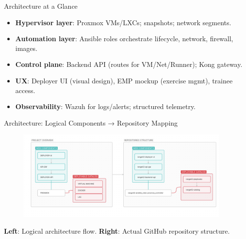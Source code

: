 \documentclass[aspectratio=169]{beamer}
\begin{document}
\begin{frame}{Architecture at a Glance}
  \begin{itemize}
    \item \textbf{Hypervisor layer}: Proxmox VMs/LXCs; snapshots; network segments.
    \item \textbf{Automation layer}: Ansible roles orchestrate lifecycle, network, firewall, images.
    \item \textbf{Control plane}: Backend API (routes for VM/Net/Runner); Kong gateway.
    \item \textbf{UX}: Deployer UI (visual design), EMP mockup (exercise mgmt), trainee access.
    \item \textbf{Observability}: Wazuh for logs/alerts; structured telemetry.
  \end{itemize}
\end{frame}

\begin{frame}{Architecture: Logical Components → Repository Mapping}
  \begin{figure}
    \centering
    \includegraphics[width=0.95\textwidth]{images/diagrams/architecture.png}
  \end{figure}
  \vspace{-2mm}
  \begin{tcolorbox}
    \faInfoCircle\; \textbf{Left}: Logical architecture flow. \textbf{Right}: Actual GitHub repository structure.
  \end{tcolorbox}
\end{frame}

\end{document}
